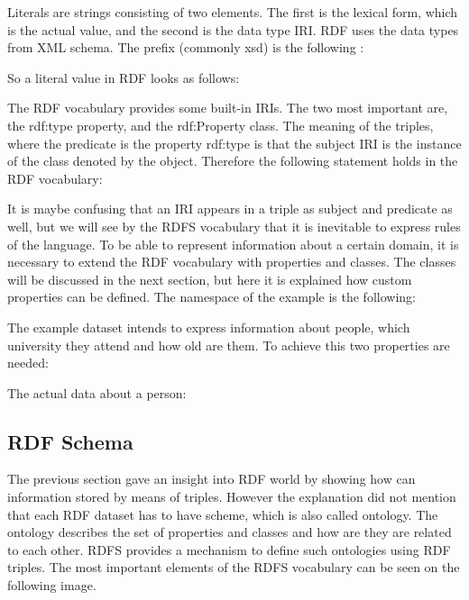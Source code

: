 
Literals are strings consisting of two elements. The first is the lexical form, which is the actual value, and the second is the data type IRI.  RDF uses the data types from XML schema. The prefix (commonly xsd) is the following :


So a literal value in RDF looks as follows:


The RDF vocabulary provides some built-in IRIs. The two most important are, the rdf:type property, and the rdf:Property class. The meaning of the triples, where the predicate is the property rdf:type  is that the subject IRI is the instance of the class denoted by the object. Therefore the following statement holds in the RDF vocabulary:


It is maybe confusing that an IRI appears in a triple as subject and predicate as well, but we will see by the RDFS vocabulary that it is inevitable to express rules of the language.  
To be able to represent information about a certain domain, it is necessary to extend the RDF vocabulary with properties and classes. The classes will be discussed in the next section, but here it is explained how custom properties can be defined. The namespace of the example is the following: 



The example dataset intends to express information about people, which university they attend and how old are them. To achieve this two properties are needed:



The actual data about a person:



\subsection{RDF Schema}


The previous section gave an insight into RDF world by showing how can information stored by means of triples. However the explanation did not mention that each RDF dataset has to have scheme, which is also called ontology. The ontology describes the set of properties and classes and how are they are related to each other. RDFS provides a mechanism to define such ontologies using RDF triples. The most important elements of the RDFS vocabulary can be seen on the following image. 

